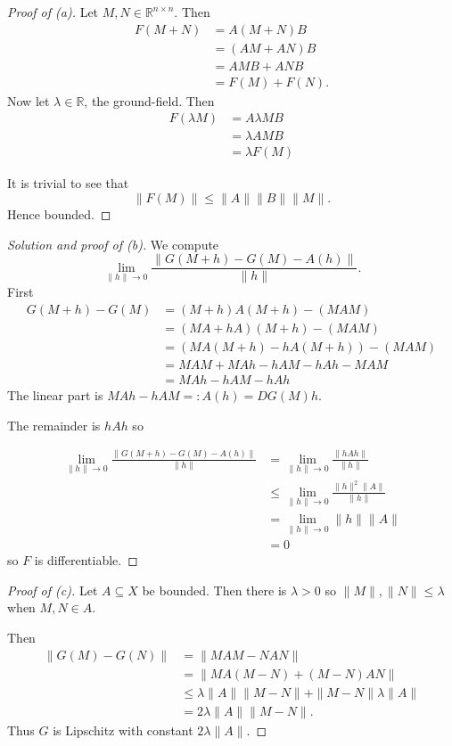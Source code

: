 \begin{proof}[Proof of (a)]
    Let $M,N \in \mathbb R^{n\times n}$. Then 
    \begin{align*}
        F(M + N) &= A(M+N)B \\ 
                 &= (AM + AN)B \\ 
                 &= AMB + ANB \\ 
                 &= F(M) + F(N).
    \end{align*}
    Now let $\lambda \in \mathbb R$, the ground-field. 
    Then 
    \begin{align*}
        F(\lambda M) &= A\lambda M B \\ 
                     &= \lambda A M B \\ 
                     &= \lambda F(M)
    \end{align*}
        
    It is trivial to see that 
    \[
        \|F(M)\| \leq \|A\|\|B\|\|M\|.  
    \]
    Hence bounded. 
\end{proof}
\begin{proof}[Solution and proof of (b)]
    We compute 
    \[
        \lim_{\|h\| \to 0} \frac{\|G(M + h) - G(M) - A(h)\|}{\|h\|}. 
    \]
    First 
    \begin{align*}
        G(M + h) - G(M) 
        &= (M + h)A(M+h) - (MAM) \\ 
        &= (MA + hA)(M+h) - (MAM) \\ 
        &= (MA(M+h) - hA(M+h)) - (MAM) \\ 
        &= MAM + MAh - hAM - hAh - MAM \\ 
        &= MAh - hAM - hAh 
    \end{align*}
    The linear part is $MAh - hAM =: A(h) = DG(M)h$. 

    The remainder is $hAh$ so 

    \begin{align*}
        \lim_{\|h\| \to 0} \frac{\|G(M+h) - G(M) - A(h)\|}{\|h\|}  
        &= \lim_{\|h\| \to 0} \frac{\|hAh\|}{\|h\|} \\ 
        &\leq \lim_{\|h\|\to 0} \frac{\|h\|^2\|A\|}{\|h\|} \\  
        &= \lim_{\|h\|\to 0} \|h\|\|A\| \\ 
        &= 0
    \end{align*}
    so $F$ is differentiable. 
\end{proof}

\begin{proof}[Proof of (c)]
    Let $A \subseteq X$ be bounded. Then there is $\lambda > 0$ so 
    $\|M\|,\|N\| \leq \lambda$ when $M,N \in A$. 

    Then 
    \begin{align*}
        \|G(M) - G(N)\| 
        &= \|MAM - NAN\| \\              
        &= \|MA(M - N) + (M-N)AN\| \\ 
        &\leq \lambda \|A\| \|M - N\| + \|M-N\|\lambda \|A\| \\ 
        &= 2 \lambda \|A\| \|M-N\|.
    \end{align*}
    Thus $G$ is Lipschitz with constant $2 \lambda \|A\|$.
\end{proof}

